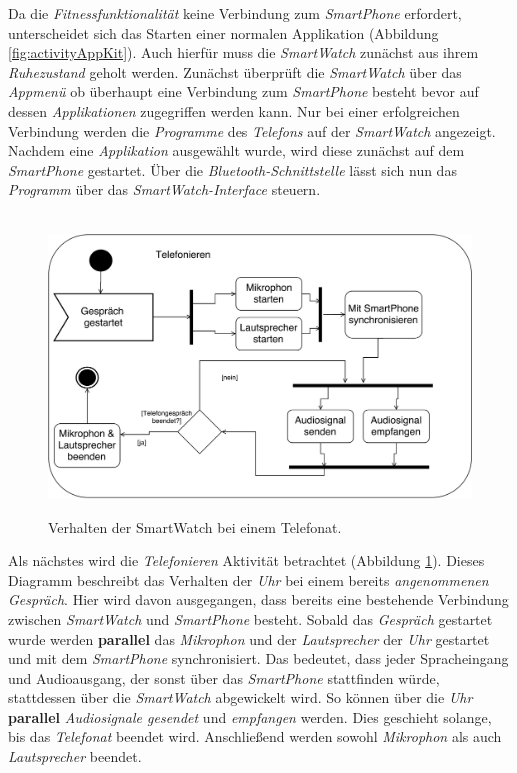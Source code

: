 Da die \textit{Fitnessfunktionalität} keine Verbindung zum \textit{SmartPhone} erfordert, unterscheidet sich das Starten einer normalen Applikation (Abbildung \ref{fig:activityAppKit}). Auch hierfür muss die \textit{SmartWatch} zunächst aus ihrem \textit{Ruhezustand} geholt werden. Zunächst überprüft die \textit{SmartWatch} über das \textit{Appmenü} ob überhaupt eine Verbindung zum \textit{SmartPhone} besteht bevor auf dessen \textit{Applikationen} zugegriffen werden kann. Nur bei einer erfolgreichen Verbindung werden die \textit{Programme} des \textit{Telefons} auf der \textit{SmartWatch} angezeigt. Nachdem eine \textit{Applikation} ausgewählt wurde, wird diese zunächst auf dem \textit{SmartPhone} gestartet. Über die \textit{Bluetooth-Schnittstelle} lässt sich nun das \textit{Programm} über das \textit{SmartWatch-Interface} steuern.\\
\begin{figure}[h]
\centering\
\includegraphics[width=\textwidth]{img/activityTelefonieren}
\caption{Verhalten der SmartWatch bei einem Telefonat.}\label{fig:activityTelefonieren}
\end{figure}
Als nächstes wird die \textit{Telefonieren} Aktivität betrachtet (Abbildung \ref{fig:activityTelefonieren}). Dieses Diagramm beschreibt das Verhalten der \textit{Uhr} bei einem bereits \textit{angenommenen Gespräch}. Hier wird davon ausgegangen, dass bereits eine bestehende Verbindung zwischen \textit{SmartWatch} und \textit{SmartPhone} besteht. Sobald das \textit{Gespräch} gestartet wurde werden \textbf{parallel} das \textit{Mikrophon} und der \textit{Lautsprecher} der \textit{Uhr} gestartet und mit dem \textit{SmartPhone} synchronisiert. Das bedeutet, dass jeder Spracheingang und Audioausgang, der sonst über das \textit{SmartPhone} stattfinden würde, stattdessen über die \textit{SmartWatch} abgewickelt wird. So können über die \textit{Uhr} \textbf{parallel} \textit{Audiosignale gesendet} und \textit{empfangen} werden. Dies geschieht solange, bis das \textit{Telefonat} beendet wird. Anschließend werden sowohl \textit{Mikrophon} als auch \textit{Lautsprecher} beendet.\\
